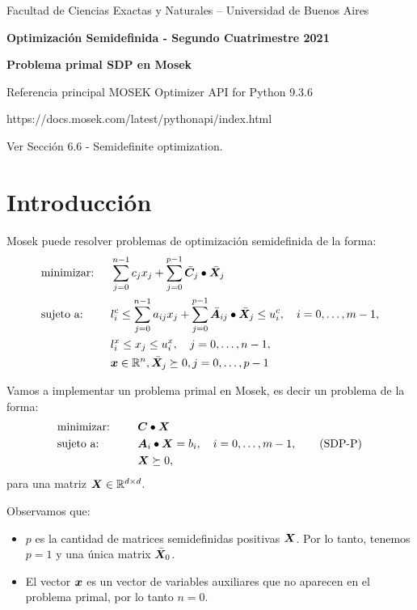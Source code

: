 \documentclass[11pt]{article}
\begin{document}
\begin{center}

{\small Facultad de Ciencias Exactas
y Naturales -- Universidad de Buenos Aires } \vskip 1cm

\textbf{{\large Optimización Semidefinida} - Segundo Cuatrimestre 2021}

\medskip\textbf{Problema primal SDP en Mosek}
\end{center}

\medskip

Referencia principal MOSEK Optimizer API for Python 9.3.6

https://docs.mosek.com/latest/pythonapi/index.html

Ver Sección 6.6 - Semidefinite optimization.

\section{Introducción}

Mosek puede resolver problemas de optimización semidefinida de la forma:
\begin{alignat*}{2}
  & \text{minimizar: } & & \sum_{j=0}^{n-1} c_j x_j + \sum_{j=0}^{p-1} \bar {\bm{C}}_j \bullet \bar {\bm{X}}_j \\
  & \text{sujeto a: }  \quad & & l_i^c \le \sum_{j=0}^{n-1} a_{ij} x_j + \sum_{j=0}^{p-1} \bar {\bm{A}}_{ij} \bullet \bar {\bm{X}}_j \le u_i^c, \quad i = 0, \dots, m-1, \\
  &  \quad & & l_i^x \le x_j \le u_i^x, \quad j = 0, \dots, n-1, \\
  & & & \bm{x} \in \mathbb{R}^n, \bar {\bm{X}}_j \succeq 0, j = 0, \dots, p-1
\end{alignat*}


Vamos a implementar un problema primal en Mosek, es decir un problema de la forma:
\begin{alignat}{2}
  & \text{minimizar: } & \quad & \bm{C} \bullet \bm{X} \nonumber \\
  & \text{sujeto a: }  \quad & & \bm{A}_i \bullet \bm{X} = b_i, \quad i = 0, \dots, m-1, \tag{SDP-P}\label{sdp-p}\\
   && & \bm{X} \succeq 0, \nonumber
\end{alignat}
para una matriz $\bm{X} \in \mathbb{R}^{d \times d}$.

Observamos que:
\begin{itemize}
\item $p$ es la cantidad de matrices semidefinidas positivas $\bm{X}$. Por lo tanto, tenemos $p = 1$ y una única matrix $\bar {\bm{X}}_0$.
\item El vector $\bm{x}$ es un vector de variables auxiliares que no aparecen en el problema primal, por lo tanto $n = 0$.
\end{itemize}
\end{document}
